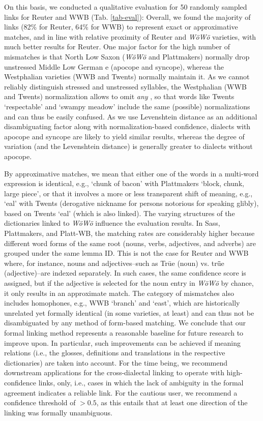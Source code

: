 On this basis, we conducted a qualitative evaluation for 50 randomly sampled links for Reuter and WWB (Tab. \ref{tab-eval}): 
Overall, we found the majority of links (82\% for Reuter, 64\% for WWB) to represent exact or approximative matches, and in line with relative proximity of Reuter and \emph{WöWö} varieties, with much better results for Reuter. One major factor for the high number of mismatches is that North Low Saxon (\emph{WöWö} and Plattmakers) normally drop unstressed Middle Low German e (apocope and syncope), whereas the Westphalian varieties (WWB and Twents) normally maintain it. 
As we cannot reliably distinguish stressed and unstressed syllables, the Westphalian (WWB and Twents) normalization allows to omit \emph{any} , so that words like Twents  `respectable' and  `swampy meadow' include the same (possible) normalizations and can thus be easily confused. As we use Levenshtein distance as an additional disambiguating factor along with normalization-based confidence, dialects with apocope and syncope are likely to yield similar results, whereas the degree of variation (and the Levenshtein distance) is generally greater to dialects without apocope.

By approximative matches, we mean that either one of the words in a multi-word expression is identical, e.g.,  `chunk of bacon' with Plattmakers  `block, chunk, large piece', or that it involves a more or less transparent shift of meaning, e.g.,  `eal' with Twents  (derogative nickname for persons notorious for speaking glibly), based on Twents  `eal' (which is also linked). 
The varying structures of the dictionaries linked to \emph{WöWö} influence the evaluation results. In Sass, Plattmakers, and Platt-WB, the matching rates are considerably higher because different word forms of the same root (nouns, verbs, adjectives, and adverbs) are grouped under the same lemma ID. This is not the case for Reuter and WWB where, for instance, nouns and adjectives--such as Trūe (noun) vs. trǖe (adjective)--are indexed separately. In such cases, the same confidence score is assigned, but if the adjective is selected for the noun entry  in \emph{WöWö} by chance, it only results in an approximate match. The category of mismatches also includes homophones, e.g., WWB  `branch' and  `east', which are historically unrelated yet formally identical (in some varieties, at least) and can thus not be disambiguated by any method of form-based matching.
We conclude that our formal linking method represents a reasonable baseline for future research to improve upon.
In particular, such improvements can be achieved if meaning relations (i.e., the glosses, definitions and translations in the respective dictionaries) are taken into account. 
For the time being, we recommend downstream applications for the cross-dialectal linking to operate with high-confidence links, only, i.e., cases in which the lack of ambiguity in the formal agreement indicates a reliable link. For the cautious user, we recommend a confidence threshold of $>0.5$, as this entails that at least one direction of the linking was formally unambiguous. 

